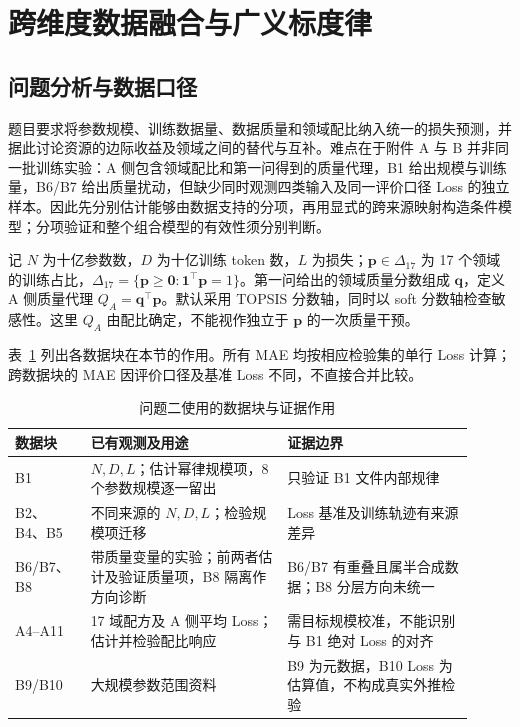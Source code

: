 \section{跨维度数据融合与广义标度律}
\label{sec:q2}

\subsection{问题分析与数据口径}

题目要求将参数规模、训练数据量、数据质量和领域配比纳入统一的损失预测，并据此讨论资源的边际收益及领域之间的替代与互补。难点在于附件 A 与 B 并非同一批训练实验：A 侧包含领域配比和第一问得到的质量代理，B1 给出规模与训练量，B6/B7 给出质量扰动，但缺少同时观测四类输入及同一评价口径 Loss 的独立样本。因此先分别估计能够由数据支持的分项，再用显式的跨来源映射构造条件模型；分项验证和整个组合模型的有效性须分别判断。

记 $N$ 为十亿参数数，$D$ 为十亿训练 token 数，$L$ 为损失；$\boldsymbol p\in\Delta_{17}$ 为 17 个领域的训练占比，$\Delta_{17}=\{\boldsymbol p\geq\boldsymbol 0:\boldsymbol 1^\top\boldsymbol p=1\}$。第一问给出的领域质量分数组成 $\boldsymbol q$，定义 A 侧质量代理 $Q_A=\boldsymbol q^\top\boldsymbol p$。默认采用 TOPSIS 分数轴，同时以 soft 分数轴检查敏感性。这里 $Q_A$ 由配比确定，不能视作独立于 $\boldsymbol p$ 的一次质量干预。

表~\ref{tab:q2-data} 列出各数据块在本节的作用。所有 MAE 均按相应检验集的单行 Loss 计算；跨数据块的 MAE 因评价口径及基准 Loss 不同，不直接合并比较。

\begin{table}[htbp]
\centering
\caption{问题二使用的数据块与证据作用}
\label{tab:q2-data}
\begin{tabular}{p{0.15\linewidth}p{0.39\linewidth}p{0.37\linewidth}}
\toprule
数据块 & 已有观测及用途 & 证据边界 \\
\midrule
B1 & $N,D,L$；估计幂律规模项，8 个参数规模逐一留出 & 只验证 B1 文件内部规律 \\
B2、B4、B5 & 不同来源的 $N,D,L$；检验规模项迁移 & Loss 基准及训练轨迹有来源差异 \\
B6/B7、B8 & 带质量变量的实验；前两者估计及验证质量项，B8 隔离作方向诊断 & B6/B7 有重叠且属半合成数据；B8 分层方向未统一 \\
A4--A11 & 17 域配方及 A 侧平均 Loss；估计并检验配比响应 & 需目标规模校准，不能识别与 B1 绝对 Loss 的对齐 \\
B9/B10 & 大规模参数范围资料 & B9 为元数据，B10 Loss 为估算值，不构成真实外推检验 \\
\bottomrule
\end{tabular}
\end{table}

